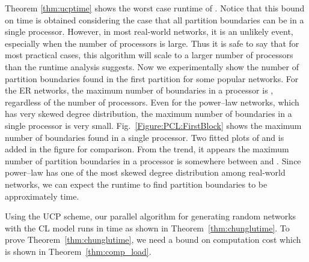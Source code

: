 \documentclass[conference,letterpaper,10pt]{IEEEtran}
\newcommand{\Figure}{Fig.\xspace}
\begin{document}
Theorem \ref{thm:ucptime} shows the worst case runtime of .
Notice that this bound on time is obtained considering the case that all  partition boundaries  can be in a single processor. However, in most real-world networks, it is an unlikely event, especially when the number of processors  is large. Thus it is safe to say that for most practical cases, this algorithm will scale to a larger number of processors than the runtime analysis suggests. Now we experimentally show the number of partition boundaries found in the first partition for some popular networks.
For the ER networks, the maximum number of boundaries in a processor is  , regardless of the number of processors. Even for the power--law networks, which has very skewed degree distribution, the maximum number of boundaries in a single processor is very small.
\Figure~\ref{Figure:PCL:FirstBlock} shows the maximum number of boundaries found in a single processor. Two fitted plots of  and  is added in the figure for comparison. From the trend, it appears the maximum number of partition boundaries in a processor is somewhere between  and . Since power--law has one of the most skewed degree distribution among real-world networks, we can expect the runtime to find partition boundaries to be approximately  time.


Using the UCP  scheme, our parallel algorithm for generating random networks with the CL model runs in   time as shown in Theorem~\ref{thm:chunglutime}. To prove Theorem~\ref{thm:chunglutime}, we need a bound on computation cost which is shown in Theorem~\ref{thm:comp_load}.
\end{document}
